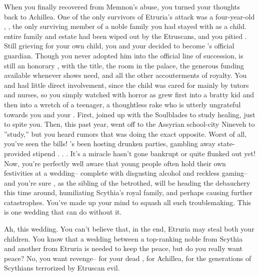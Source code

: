 \documentclass[char]{Kos}
\begin{document}
When you finally recovered from Memnon's abuse, you turned your thoughts back to Achillea. One of the only survivors of Etruria's attack was a four-year-old \cWard{\kid}, \cWard{}, the only surviving member of a noble family you had stayed with as a child. \cWard{\Their} entire family and estate had been wiped out by the Etruscans, and you pitied \cWard{\them}. Still grieving for your own child, you and your \cScythiaKing{\spouse} decided to become \cWard{}'s official guardian. Though you never adopted him into the official line of succession, \cWard{\they} is still an honorary \cWard{\prince}, with the title, the room in the palace, the generous funding available whenever \cWard{\they} shows need, and all the other accouterments of royalty. You and \cScythiaKing{} had little direct involvement, since the child was cared for mainly by tutors and nurses, so you simply watched with horror as \cWard{} grew first into a bratty kid and then into a wretch of a teenager, a thoughtless rake who is utterly ungrateful towards you and your \cScythiaKing{\spouse}. First, \cWard{\they} joined up with the Soulblades to study healing, just to spite you. Then, this past year, \cWard{\they} went off to the Assyrian school-city Nineveh to ''study,'' but you heard rumors that \cWard{\they} was doing the exact opposite. Worst of all, you've seen the bills! \cWard{\They}'s been hosting drunken parties, gambling away \cWard{\their} state-provided stipend . . . It's a miracle \cWard{\they} hasn't gone bankrupt or quite flunked out yet! Now, you're perfectly well aware that young people often hold their own festivities at a wedding-- complete with disgusting alcohol and reckless gaming-- and you're sure \cWard{}, as the sibling of the betrothed, will be heading the debauchery this time around, humiliating Scythia's royal family, and perhaps causing further catastrophes. You've made up your mind to squash all such troublemaking. This is one wedding that can do without it.

Ah, this wedding. You can't believe that, in the end, Etruria may steal both your children. You know that a wedding between a top-ranking noble from Scythia and another from Etruria is needed to keep the peace, but do you really want peace? No, you want revenge-- for your dead \cFugitive{\offspring}, for Achillea, for the generations of Scythians terrorized by Etruscan evil. 
\end{document}
